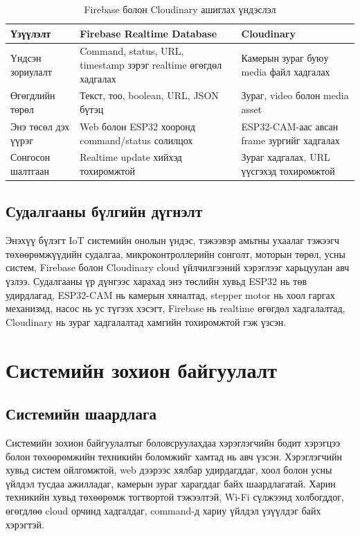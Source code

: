 \documentclass[12pt,a4paper]{report}
\begin{document}
\begin{table}[H]
\centering
\caption{Firebase болон Cloudinary ашиглах үндэслэл}
\begin{tabularx}{\textwidth}{|X|X|X|}
\hline
\textbf{Үзүүлэлт} & \textbf{Firebase Realtime Database} & \textbf{Cloudinary} \\ \hline
Үндсэн зориулалт & Command, status, URL, timestamp зэрэг realtime өгөгдөл хадгалах & Камерын зураг буюу media файл хадгалах \\ \hline
Өгөгдлийн төрөл & Текст, тоо, boolean, URL, JSON бүтэц & Зураг, video болон media asset \\ \hline
Энэ төсөл дэх үүрэг & Web болон ESP32 хооронд command/status солилцох & ESP32-CAM-аас авсан frame зургийг хадгалах \\ \hline
Сонгосон шалтгаан & Realtime update хийхэд тохиромжтой & Зураг хадгалах, URL үүсгэхэд тохиромжтой \\ \hline
\end{tabularx}
\end{table}

\section{Судалгааны бүлгийн дүгнэлт}

Энэхүү бүлэгт IoT системийн онолын үндэс, тэжээвэр амьтны ухаалаг тэжээгч төхөөрөмжүүдийн судалгаа, микроконтроллерийн сонголт, моторын төрөл, усны систем, Firebase болон Cloudinary cloud үйлчилгээний хэрэглээг харьцуулан авч үзлээ. Судалгааны үр дүнгээс харахад энэ төслийн хувьд ESP32 нь төв удирдлагад, ESP32-CAM нь камерын хяналтад, stepper motor нь хоол гаргах механизмд, насос нь ус түгээх хэсэгт, Firebase нь realtime өгөгдөл хадгалалтад, Cloudinary нь зураг хадгалалтад хамгийн тохиромжтой гэж үзсэн.

\chapter{Системийн зохион байгуулалт}

\section{Системийн шаардлага}

Системийн зохион байгуулалтыг боловсруулахдаа хэрэглэгчийн бодит хэрэгцээ болон төхөөрөмжийн техникийн боломжийг хамтад нь авч үзсэн. Хэрэглэгчийн хувьд систем ойлгомжтой, web дээрээс хялбар удирдагддаг, хоол болон усны үйлдэл тусдаа ажилладаг, камерын зураг харагддаг байх шаардлагатай. Харин техникийн хувьд төхөөрөмж тогтвортой тэжээлтэй, Wi-Fi сүлжээнд холбогддог, өгөгдлөө cloud орчинд хадгалдаг, command-д хариу үйлдэл үзүүлдэг байх хэрэгтэй.
\end{document}
